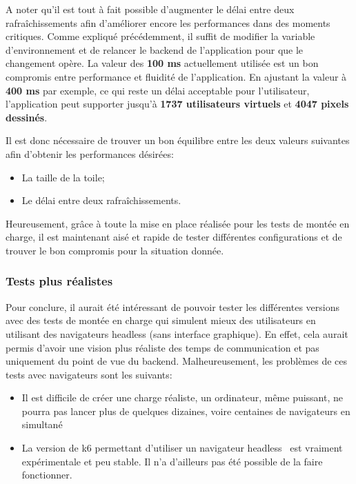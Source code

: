 A noter qu'il est tout à fait possible d'augmenter le délai entre deux rafraîchissements afin d'améliorer encore les performances dans des moments critiques. Comme expliqué précédemment, il suffit de modifier la variable d'environnement et de relancer le backend de l'application pour que le changement opère. La valeur des \textbf{100 ms} actuellement utilisée est un bon compromis entre performance et fluidité de l'application. En ajustant la valeur à \textbf{400 ms} par exemple, ce qui reste un délai acceptable pour l'utilisateur, l'application peut supporter jusqu'à \textbf{1737 utilisateurs virtuels} et \textbf{4047 pixels dessinés}.

Il est donc nécessaire de trouver un bon équilibre entre les deux valeurs suivantes afin d'obtenir les performances désirées:

\begin{itemize}
  \item La taille de la toile;
  \item Le délai entre deux rafraîchissements.
\end{itemize}

Heureusement, grâce à toute la mise en place réalisée pour les tests de montée en charge, il est maintenant aisé et rapide de tester différentes configurations et de trouver le bon compromis pour la situation donnée.

\subsubsection{Tests plus réalistes}

Pour conclure, il aurait été intéressant de pouvoir tester les différentes versions avec des tests de montée en charge qui simulent mieux des utilisateurs en utilisant des navigateurs headless (sans interface graphique). En effet, cela aurait permis d'avoir une vision plus réaliste des temps de communication et pas uniquement du point de vue du backend. Malheureusement, les problèmes de ces tests avec navigateurs sont les suivants:

\begin{itemize}
  \item Il est difficile de créer une charge réaliste, un ordinateur, même puissant, ne pourra pas lancer plus de quelques dizaines, voire centaines de navigateurs en simultané
  \item La version de k6 permettant d'utiliser un navigateur headless~\cite{k6-browser} est vraiment expérimentale et peu stable. Il n'a d'ailleurs pas été possible de la faire fonctionner.
\end{itemize}

